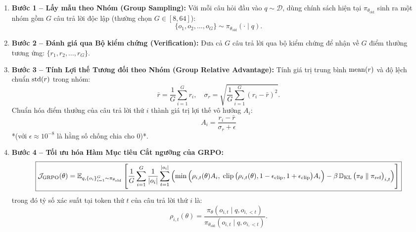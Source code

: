 \begin{enumerate}[leftmargin=1.2cm]
    \item \textbf{Bước 1 -- Lấy mẫu theo Nhóm (Group Sampling):} Với mỗi câu hỏi đầu vào $q \sim \mathcal{D}$, dùng chính sách hiện tại $\pi_{\theta_{\text{old}}}$ sinh ra một nhóm gồm $G$ câu trả lời độc lập (thường chọn $G \in [8, 64]$):
    \begin{equation}
        \{o_1, o_2, \dots, o_G\} \sim \pi_{\theta_{\text{old}}}(\cdot \mid q).
    \end{equation}
    \item \textbf{Bước 2 -- Đánh giá qua Bộ kiểm chứng (Verification):} Đưa cả $G$ câu trả lời qua bộ kiểm chứng để nhận về $G$ điểm thưởng tương ứng: $\{r_1, r_2, \dots, r_G\}$.
    \item \textbf{Bước 3 -- Tính Lợi thế Tương đối theo Nhóm (Group Relative Advantage):} Tính giá trị trung bình $\operatorname{\mathrm{mean}}(r)$ và độ lệch chuẩn $\operatorname{\mathrm{std}}(r)$ trong nhóm:
    \begin{equation}
        \bar{r} = \frac{1}{G} \sum_{i=1}^{G} r_i, \quad \sigma_r = \sqrt{\frac{1}{G} \sum_{i=1}^{G} (r_i - \bar{r})^2}.
    \end{equation}
    Chuẩn hóa điểm thưởng của câu trả lời thứ $i$ thành giá trị lợi thế vô hướng $A_i$:
    \begin{equation}
        \boxed{A_i = \frac{r_i - \bar{r}}{\sigma_r + \epsilon}}
        \label{eq:grpo_advantage}
    \end{equation}
    *(với $\epsilon \approx 10^{-8}$ là hằng số chống chia cho $0$)*.
    \item \textbf{Bước 4 -- Tối ưu hóa Hàm Mục tiêu Cắt ngưỡng của GRPO:}
    \begin{equation}
        \boxed{\mathcal{J}_{\text{GRPO}}(\theta) = \operatorname{\mathbb{E}}_{q, \{o_i\}_{i=1}^G \sim \pi_{\theta_{\text{old}}}} \left[ \frac{1}{G} \sum_{i=1}^{G} \frac{1}{|o_i|} \sum_{t=1}^{|o_i|} \left( \min\Big( \rho_{i,t}(\theta) A_i,\; \operatorname{\mathrm{clip}}\big(\rho_{i,t}(\theta), 1-\epsilon_{\text{clip}}, 1+\epsilon_{\text{clip}}\big) A_i \Big) - \beta \operatorname{\mathbb{D}_{\mathrm{KL}}}\big(\pi_\theta \parallel \pi_{\text{ref}}\big)_{i,t} \right) \right]}
        \label{eq:grpo_objective}
    \end{equation}
    trong đó tỷ số xác suất tại token thứ $t$ của câu trả lời thứ $i$ là:
    \begin{equation}
        \rho_{i,t}(\theta) = \frac{\pi_\theta(o_{i,t} \mid q, o_{i,<t})}{\pi_{\theta_{\text{old}}}(o_{i,t} \mid q, o_{i,<t})}.
    \end{equation}
\end{enumerate}


